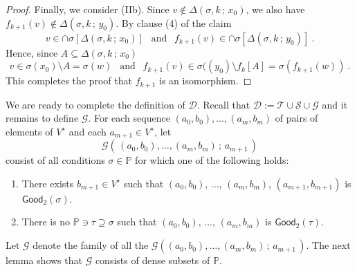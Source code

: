 \documentclass[10pt,a4paper, openany,  oldfontcommands]{memoir}
\newtheorem{open problem} [theorem] {Open Problem}
\begin{document}
\begin{proof}
Finally,  we consider (IIb). 
Since   $  v  \not\in   \Delta \left(  \sigma , k \,  ;   \,   x_0   \right)    $,  
we also have     $  f_{ k+1}   \left( v  \right)    \not\in   \Delta \left(  \sigma , k \,  ;   \,   y_0   \right)    $. 
By clause (4)  of the claim  
\[
v  \in  \cap   \sigma  \left[       \Delta \left(  \sigma , k \,  ;   \,   x_0   \right)     \right]   
\    \     \mbox{  and   }     \      \  
f_{ k+1}  \left( v  \right)   \in  \cap   \sigma  \left[       \Delta \left(  \sigma , k \,  ;   \,   y_0   \right)     \right]   
\     .
\] 
Hence,  since   $  A  \subseteq      \Delta \left(  \sigma , k \,  ;   \,   x_0   \right)    $
\[
v  \in     \sigma  ( x_0  )   \setminus  A   =   \sigma ( w )  
\     \    \mbox{  and   }    \     \
f_{ k+1}  \left( v  \right)   \in        \sigma  (\left(   y_0      \right)   \setminus   f_k  \left[ A  \right]        =   \sigma   \left(   f_{ k+1}    (w )    \right)  
\      .
\]
This completes the proof that  $  f_{ k+1}  $  is an isomorphism.
\end{proof}






 
 
 
 
 We are ready to complete the definition of  $  \mathcal{D} $. 
 Recall that  $   \mathcal{D}   :=   \mathcal{T}  \cup   \mathcal{S}  \cup  \mathcal{G}   $ and it remains to define  $  \mathcal{G}  $. 
 For each    sequence   $  (a_0,  b_0 ) ,  \ldots , (a_m ,  b_m ) $ of pairs of elements  of    $  V^{  \star }   $
 and each $    a_{ m+1}   \in  V^{  \star } $, 
 let 
 \[
 \mathcal{G}   \left(    \,      (a_0,  b_0 ) ,  \ldots , (a_m , b_m ) \,  ;   \,   a_{ m+1}      \,    \right) 
\]  
consist  of all conditions  $  \sigma  \in  \mathbb{P} $ for which  one of the following holds: 
   \begin{enumerate}
   
\item   There exists     $  b_{  m+1 }   \in   V^{  \star }  $ such that   
$  (a_0,  b_0 ) $,  $\ldots $,   $(a_m , b_m )  $,      $ (a_{ m+1 } ,  b_{ m+1 } ) $  is  $ \mathsf{Good}_2 \left(   \sigma  \right)   $.




\item There is no   $  \mathbb{P}   \ni  \tau \supseteq  \sigma $  such that 
  $  (a_0,  b_0 )   $,   $\ldots   $,  $ (a_m , b_m ) $  is  $ \mathsf{Good}_2  \left(   \tau   \right)   $.
 \end{enumerate} 
 Let    $ \mathcal{G}  $ denote the family of all  the    
 $   \mathcal{G}    \left(     (a_0,  b_0 ) ,  \ldots , (a_m , b_m ) \,  ;   \,   a_{ m+1}      \,    \right)  $. 
The next   lemma  shows that $  \mathcal{G}  $ consists of dense subsets of  $  \mathbb{P}  $.
\end{document}
